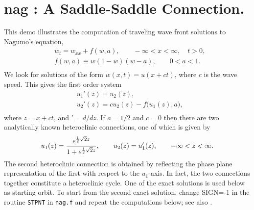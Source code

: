 \documentclass[12pt]{report}
\begin{document}
\section{ nag : A Saddle-Saddle Connection.} \label{sec:Demos_nag}
This demo illustrates the computation of traveling wave front solutions
to Nagumo's equation,
\begin{equation} \begin{array}{cl}
  & w_t = w_{xx} + f(w,a),
  \qquad -\infty < x < \infty,
  \quad  t > 0,  \\
  & f(w,a) \equiv w(1-w)(w-a), \qquad 0<a<1.  \\
\end{array} \end{equation}
We look for solutions of the form $w(x,t)=u(x+ct)$, where
$c$ is the wave speed.
This gives the first order system
\begin{equation} \begin{array}{cl}
  &  u_1'(z)  = u_2(z),  \\
  &  u_2'(z)  = c u_2(z) - f\bigl(u_1(z),a\bigr),  \\
\end{array} \end{equation}
where $z=x+ct$, and $' = d/dz$.
If $a=1/2$ and $c=0$ then there are two analytically known
heteroclinic connections, one of which is given by
$$ u_1(z) = {
  {e^{{1 \over 2} \sqrt{2} z}}
  \over
  {1 + e^{{1 \over 2} \sqrt{2} z}}  },
  \qquad  u_2(z) = u_1'(z),  \qquad  -\infty < z < \infty.
  $$
The second heteroclinic connection is obtained by reflecting the
phase plane representation of the first with respect to the
$u_1$-axis.
In fact, the two connections together constitute a heteroclinic cycle.
One of the exact solutions is used below as starting orbit.
To start from the second exact solution, change SIGN=-1 in the  
routine {\tt STPNT} in {\tt nag.f} and repeat the computations below;
see also
 \citeyear{FrDo:91}.
\end{document}
